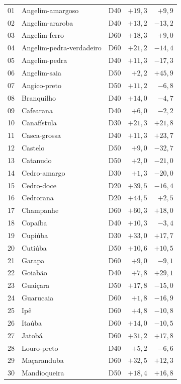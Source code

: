 \begin{longtable}{@{}r p{} c rr@{}}
01 & Angelim-amargoso & D40 & $+19{,}3$ & $+9{,}9$ \\
02 & Angelim-araroba & D40 & $+13{,}2$ & $-13{,}2$ \\
03 & Angelim-ferro & D60 & $+18{,}3$ & $+9{,}0$ \\
04 & Angelim-pedra-verdadeiro & D60 & $+21{,}2$ & $-14{,}4$ \\
05 & Angelim-pedra & D40 & $+11{,}3$ & $-17{,}3$ \\
06 & Angelim-saia & D50 & $+2{,}2$ & $+45{,}9$ \\
07 & Angico-preto & D50 & $+11{,}2$ & $-6{,}8$ \\
08 & Branquilho & D40 & $+14{,}0$ & $-4{,}7$ \\
09 & Cafearana & D40 & $+6{,}0$ & $-2{,}2$ \\
10 & Canafístula & D30 & $+21{,}3$ & $+21{,}8$ \\
11 & Casca-grossa & D40 & $+11{,}3$ & $+23{,}7$ \\
12 & Castelo & D50 & $+9{,}0$ & $-32{,}7$ \\
13 & Catanudo & D50 & $+2{,}0$ & $-21{,}0$ \\
14 & Cedro-amargo & D30 & $+1{,}3$ & $-20{,}0$ \\
15 & Cedro-doce & D20 & $+39{,}5$ & $-16{,}4$ \\
16 & Cedrorana & D20 & $+44{,}5$ & $+2{,}5$ \\
17 & Champanhe & D60 & $+60{,}3$ & $+18{,}0$ \\
18 & Copaíba & D40 & $+10{,}3$ & $-3{,}4$ \\
19 & Cupiúba & D30 & $+33{,}0$ & $+17{,}7$ \\
20 & Cutiúba & D50 & $+10{,}6$ & $+10{,}5$ \\
21 & Garapa & D60 & $+9{,}0$ & $-9{,}1$ \\
22 & Goiabão & D40 & $+7{,}8$ & $+29{,}1$ \\
23 & Guaiçara & D50 & $+17{,}8$ & $-15{,}0$ \\
24 & Guarucaia & D60 & $+1{,}8$ & $-16{,}9$ \\
25 & Ipê & D60 & $+4{,}8$ & $-10{,}8$ \\
26 & Itaúba & D60 & $+14{,}0$ & $-10{,}5$ \\
27 & Jatobá & D60 & $+31{,}2$ & $+17{,}8$ \\
28 & Louro-preto & D40 & $+5{,}2$ & $-6{,}6$ \\
29 & Maçaranduba & D60 & $+32{,}5$ & $+12{,}3$ \\
30 & Mandioqueira & D50 & $+18{,}4$ & $+16{,}8$ \\

\end{longtable}
